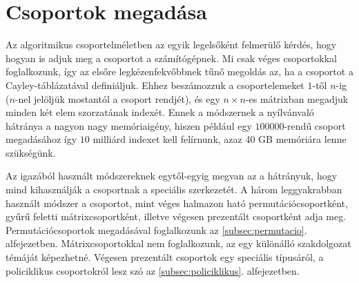 \section{Csoportok megadása}
\label{sec:csoport}
Az algoritmikus csoportelméletben az egyik legelsőként felmerülő kérdés, hogy hogyan is adjuk meg
a csoportot a számítógépnek.
Mi csak véges csoportokkal foglalkozunk, így az elsőre legkézenfekvőbbnek tűnő megoldás az, ha a
csoportot a Cayley-táblázatával definiáljuk.
Ehhez beszámozzuk a csoportelemeket $1$-től $n$-ig ($n$-nel jelöljük mostantól a csoport rendjét),
és egy $n\times n$-es mátrixban megadjuk minden két elem szorzatának indexét.
Ennek a módszernek a nyílvánvaló hátránya a nagyon nagy memóriaigény,
hiszen például egy $100000$-rendű csoport megadásához így $10$ milliárd indexet kell felírnunk,
azaz 40 GB memóriára lenne szükségünk.

Az igazából használt módszereknek egytől-egyig megvan az a hátrányuk, hogy mind kihasználják
a csoportnak a speciális szerkezetét.
A három leggyakrabban használt módszer a csoportot, mint véges halmazon ható permutációcsoportként,
gyűrű feletti mátrixcsoportként, illetve végesen prezentált csoportként adja meg.
Permutációcsoportok megadásával foglalkozunk az \ref{subsec:permutacio}. alfejezetben.
Mátrixcsoportokkal nem foglalkozunk, az egy különálló szakdolgozat témáját képezhetné.
Végesen prezentált csoportok egy speciális típusáról, a policiklikus csoportokról lesz szó
az \ref{subsec:policiklikus}. alfejezetben.




\clearpage
